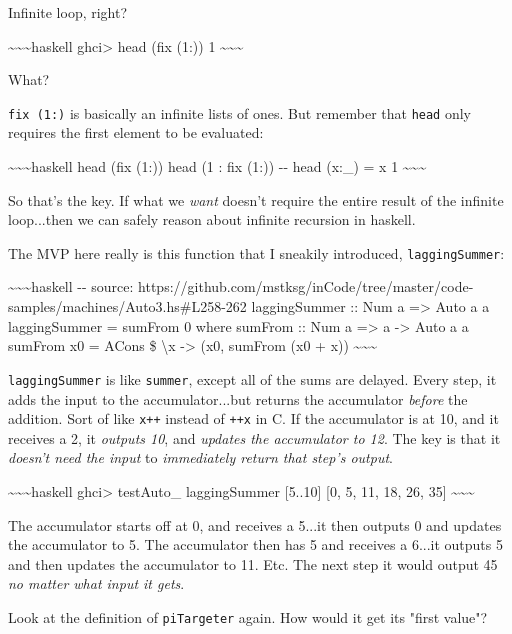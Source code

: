 \documentclass[]{article}
\begin{document}
Infinite loop, right?

\textasciitilde{}\textasciitilde{}\textasciitilde{}haskell ghci\textgreater{}
head (fix (1:)) 1 \textasciitilde{}\textasciitilde{}\textasciitilde{}

What?

\texttt{fix\ (1:)} is basically an infinite lists of ones. But remember that
\texttt{head} only requires the first element to be evaluated:

\textasciitilde{}\textasciitilde{}\textasciitilde{}haskell head (fix (1:)) head
(1 : fix (1:)) -\/- head (x:\_) = x 1
\textasciitilde{}\textasciitilde{}\textasciitilde{}

So that's the key. If what we \emph{want} doesn't require the entire result of
the infinite loop...then we can safely reason about infinite recursion in
haskell.

The MVP here really is this function that I sneakily introduced,
\texttt{laggingSummer}:

\textasciitilde{}\textasciitilde{}\textasciitilde{}haskell -\/- source:
https://github.com/mstksg/inCode/tree/master/code-samples/machines/Auto3.hs\#L258-262
laggingSummer :: Num a =\textgreater{} Auto a a laggingSummer = sumFrom 0 where
sumFrom :: Num a =\textgreater{} a -\textgreater{} Auto a a sumFrom x0 = ACons
\$ \textbackslash{}x -\textgreater{} (x0, sumFrom (x0 + x))
\textasciitilde{}\textasciitilde{}\textasciitilde{}

\texttt{laggingSummer} is like \texttt{summer}, except all of the sums are
delayed. Every step, it adds the input to the accumulator...but returns the
accumulator \emph{before} the addition. Sort of like \texttt{x++} instead of
\texttt{++x} in C. If the accumulator is at 10, and it receives a 2, it
\emph{outputs 10}, and \emph{updates the accumulator to 12}. The key is that it
\emph{doesn't need the input} to \emph{immediately return that step's output}.

\textasciitilde{}\textasciitilde{}\textasciitilde{}haskell ghci\textgreater{}
testAuto\_ laggingSummer {[}5..10{]} {[}0, 5, 11, 18, 26, 35{]}
\textasciitilde{}\textasciitilde{}\textasciitilde{}

The accumulator starts off at 0, and receives a 5...it then outputs 0 and
updates the accumulator to 5. The accumulator then has 5 and receives a 6...it
outputs 5 and then updates the accumulator to 11. Etc. The next step it would
output 45 \emph{no matter what input it gets}.

Look at the definition of \texttt{piTargeter} again. How would it get its "first
value"?
\end{document}
